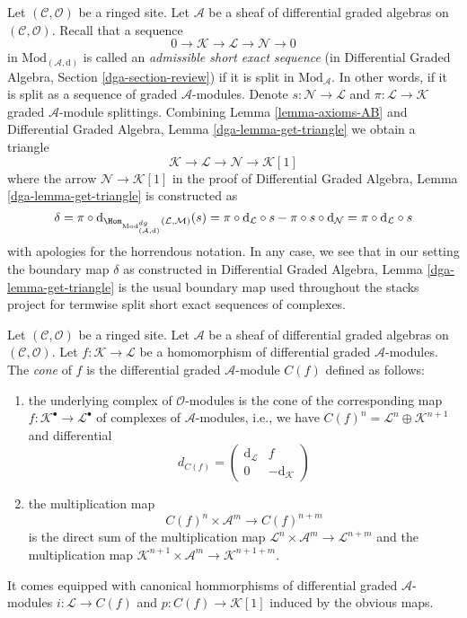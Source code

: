\medskip\noindent
Let $(\mathcal{C}, \mathcal{O})$ be a ringed site.
Let $\mathcal{A}$ be a sheaf of differential graded algebras
on $(\mathcal{C}, \mathcal{O})$.
Recall that a sequence
$$
0 \to \mathcal{K} \to \mathcal{L} \to \mathcal{N} \to 0
$$
in $\text{Mod}_{(\mathcal{A}, \text{d})}$
is called an {\it admissible short exact sequence}
(in Differential Graded Algebra, Section \ref{dga-section-review})
if it is split in $\text{Mod}_\mathcal{A}$. In other words, if it is split
as a sequence of graded $\mathcal{A}$-modules. Denote
$s : \mathcal{N} \to \mathcal{L}$ and
$\pi : \mathcal{L} \to \mathcal{K}$
graded $\mathcal{A}$-module splittings.
Combining Lemma \ref{lemma-axioms-AB} and 
Differential Graded Algebra, Lemma \ref{dga-lemma-get-triangle}
we obtain a triangle
$$
\mathcal{K} \to \mathcal{L} \to \mathcal{N} \to \mathcal{K}[1]
$$
where the arrow $\mathcal{N} \to \mathcal{K}[1]$ in the proof
of Differential Graded Algebra, Lemma \ref{dga-lemma-get-triangle}
is constructed as
$$
\delta = \pi \circ
\text{d}_{\Hom_{\text{Mod}^{dg}_{(\mathcal{A}, \text{d})}}
(\mathcal{L}, \mathcal{M})}(s) =
\pi \circ \text{d}_\mathcal{L} \circ s -
\pi \circ s \circ \text{d}_\mathcal{N} =
\pi \circ \text{d}_\mathcal{L} \circ s
$$
with apologies for the horrendous notation. In any case, we see that
in our setting the boundary map $\delta$ as constructed in
Differential Graded Algebra, Lemma \ref{dga-lemma-get-triangle}
is the usual boundary map used throughout the stacks project
for termwise split short exact sequences of complexes.

\begin{definition}
\label{definition-cone}
Let $(\mathcal{C}, \mathcal{O})$ be a ringed site.
Let $\mathcal{A}$ be a sheaf of differential graded algebras
on $(\mathcal{C}, \mathcal{O})$.
Let $f : \mathcal{K} \to \mathcal{L}$
be a homomorphism of differential graded $\mathcal{A}$-modules.
The {\it cone} of $f$ is the differential graded $\mathcal{A}$-module
$C(f)$ defined as follows:
\begin{enumerate}
\item the underlying complex of $\mathcal{O}$-modules
is the cone of the corresponding map
$f : \mathcal{K}^\bullet \to \mathcal{L}^\bullet$ of
complexes of $\mathcal{A}$-modules, i.e., we have
$C(f)^n = \mathcal{L}^n \oplus \mathcal{K}^{n + 1}$ and
differential
$$
d_{C(f)} =
\left(
\begin{matrix}
\text{d}_\mathcal{L} & f \\
0 & -\text{d}_\mathcal{K}
\end{matrix}
\right)
$$
\item the multiplication map
$$
C(f)^n \times \mathcal{A}^m \to C(f)^{n + m}
$$
is the direct sum of the multiplication map
$\mathcal{L}^n \times \mathcal{A}^m \to \mathcal{L}^{n + m}$
and the multiplication map
$\mathcal{K}^{n + 1} \times \mathcal{A}^m \to \mathcal{K}^{n + 1 + m}$.
\end{enumerate}
It comes equipped with canonical hommorphisms of differential graded
$\mathcal{A}$-modules $i : \mathcal{L} \to C(f)$
and $p : C(f) \to \mathcal{K}[1]$ induced by the obvious maps.
\end{definition}

